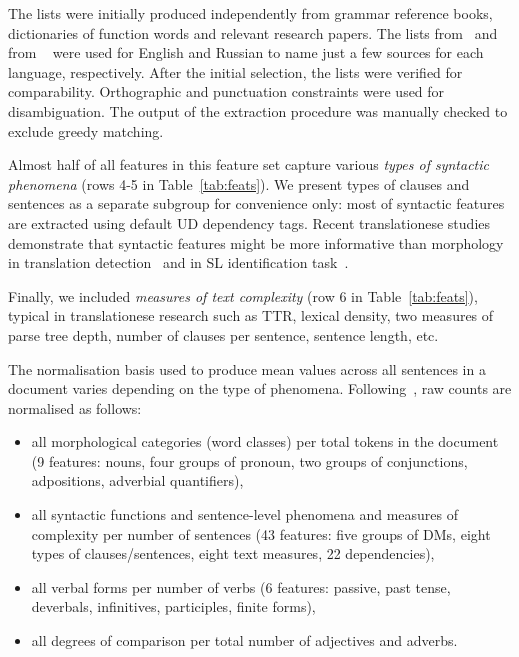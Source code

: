 The lists were initially produced independently from grammar reference books, dictionaries of function words and relevant research papers. The lists from~\citet{Biber1999,Fraser2006,Liu2008} and from ~\citet{Shvedova1980,Priyatkina2001,Novikova2008} were used for English and Russian to name just a few sources for each language, respectively. After the initial selection, the lists were verified for comparability. Orthographic and punctuation constraints were used for disambiguation. The output of the extraction procedure was manually checked to exclude greedy matching.

Almost half of all features in this feature set capture various \textit{types of syntactic phenomena} (rows 4-5 in Table~\ref{tab:feats}). We present types of clauses and sentences as a separate subgroup for convenience only: most of syntactic features are extracted using default UD dependency tags. Recent translationese studies demonstrate that syntactic features might be more informative than morphology in translation detection~\cite{Hu2021} and in SL identification task~\cite{Chowdhury2020}.  

Finally, we included \textit{measures of text complexity} (row 6 in Table~\ref{tab:feats}), typical in translationese research such as \gls{TTR}, lexical density, two measures of parse tree depth, number of clauses per sentence, sentence length, etc. 

The normalisation basis used to produce mean values across all sentences in a document varies depending on the type of phenomena. Following~\citet{Evert2017}, raw counts are normalised as follows:
\begin{itemize}
	\item all morphological categories (word classes) per total tokens in the document (9 features: nouns, four groups of pronoun, two groups of conjunctions, adpositions, adverbial quantifiers),
	\item all syntactic functions and sentence-level phenomena and measures of complexity per number of sentences (43 features: five groups of DMs, eight types of clauses/sentences, eight text measures, 22 dependencies),
	\item all verbal forms per number of verbs (6 features: passive, past tense, deverbals, infinitives, participles, finite forms),
	\item all degrees of comparison per total number of adjectives and adverbs.
\end{itemize}

